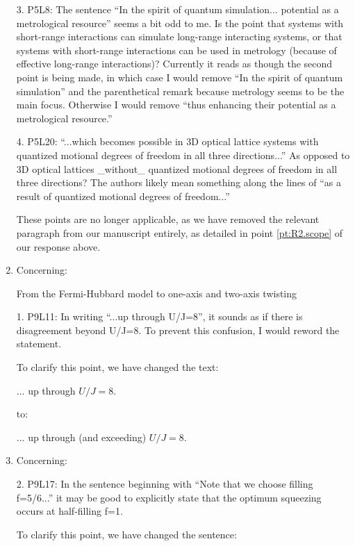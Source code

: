 \documentclass[preprint,superscriptaddress]{revtex4-2}
\newcommand{\blue}[1]{{\color{blue} #1}}
\newcommand{\red}[1]{{\color{red} #1}}
\newcommand{\green}[1]{{\color{ForestGreen} #1}}
\begin{document}
\begin{enumerate}
  \blue{3. P5L8: The sentence ``In the spirit of quantum
    simulation... potential as a metrological resource'' seems a bit
    odd to me. Is the point that systems with short-range interactions
    can simulate long-range interacting systems, or that systems with
    short-range interactions can be used in metrology (because of
    effective long-range interactions)? Currently it reads as though
    the second point is being made, in which case I would remove ``In
    the spirit of quantum simulation'' and the parenthetical remark
    because metrology seems to be the main focus. Otherwise I would
    remove ``thus enhancing their potential as a metrological
    resource.''}

  \blue{4. P5L20: ``...which becomes possible in 3D optical lattice
    systems with quantized motional degrees of freedom in all three
    directions...''  As opposed to 3D optical lattices \_without\_
    quantized motional degrees of freedom in all three directions? The
    authors likely mean something along the lines of ``as a result of
    quantized motional degrees of freedom...''}

  These points are no longer applicable, as we have removed the
  relevant paragraph from our manuscript entirely, as detailed in
  point \ref{pt:R2.scope} of our response above.

\item Concerning:

  \blue{From the Fermi-Hubbard model to one-axis and two-axis
    twisting}

  \blue{1. P9L11: In writing ``...up through U/J=8'', it sounds as if
    there is disagreement beyond U/J=8. To prevent this confusion, I
    would reword the statement.}

  To clarify this point, we have changed the text:

  \red{... up through $U/J=8$.}

  to:

  \green{... up through (and exceeding) $U/J=8$.}

\item Concerning:

  \blue{2. P9L17: In the sentence beginning with ``Note that we choose
    filling f=5/6...'' it may be good to explicitly state that the
    optimum squeezing occurs at half-filling f=1.}

  To clarify this point, we have changed the sentence:


\end{enumerate}
\end{document}
